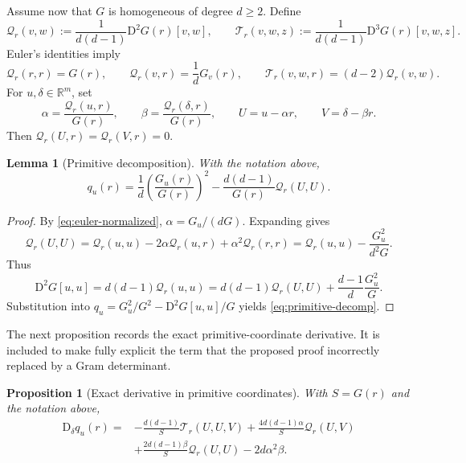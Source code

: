 \documentclass[11pt]{article}
\newtheorem{proposition}[theorem]{Proposition}
\newtheorem{lemma}[theorem]{Lemma}
\theoremstyle{definition}
\newcommand{\R}{\mathbb{R}}
\newcommand{\D}{\mathrm{D}}
\newcommand{\Q}{\mathcal{Q}}
\newcommand{\T}{\mathcal{T}}
\begin{document}
Assume now that $G$ is homogeneous of degree $d\ge2$.  Define
\[
 \Q_r(v,w):=\frac{1}{d(d-1)}\D^2G(r)[v,w],
 \qquad
 \T_r(v,w,z):=\frac{1}{d(d-1)}\D^3G(r)[v,w,z].
\]
Euler's identities imply
\begin{equation}\label{eq:euler-normalized}
 \Q_r(r,r)=G(r),
 \qquad
 \Q_r(v,r)=\frac1dG_v(r),
 \qquad
 \T_r(v,w,r)=(d-2)\Q_r(v,w).
\end{equation}
For $u,\delta\in\R^m$, set
\[
 \alpha=\frac{\Q_r(u,r)}{G(r)},\qquad
 \beta =\frac{\Q_r(\delta,r)}{G(r)},\qquad
 U=u-\alpha r,\qquad V=\delta-\beta r.
\]
Then $\Q_r(U,r)=\Q_r(V,r)=0$.

\begin{lemma}[Primitive decomposition]\label{lem:primitive-decomp}
With the notation above,
\begin{equation}\label{eq:primitive-decomp}
 q_u(r)
 =\frac1d\left(\frac{G_u(r)}{G(r)}\right)^2
  -\frac{d(d-1)}{G(r)}\Q_r(U,U).
\end{equation}
\end{lemma}

\begin{proof}
By \eqref{eq:euler-normalized}, $\alpha=G_u/(dG)$.  Expanding gives
\[
 \Q_r(U,U)=\Q_r(u,u)-2\alpha\Q_r(u,r)+\alpha^2\Q_r(r,r)
 =\Q_r(u,u)-\frac{G_u^2}{d^2G}.
\]
Thus
\[
 \D^2G[u,u]=d(d-1)\Q_r(u,u)
 =d(d-1)\Q_r(U,U)+\frac{d-1}{d}\frac{G_u^2}{G}.
\]
Substitution into
$q_u=G_u^2/G^2-\D^2G[u,u]/G$ yields \eqref{eq:primitive-decomp}.
\end{proof}

The next proposition records the exact primitive-coordinate derivative.  It is included to make
fully explicit the term that the proposed proof incorrectly replaced by a Gram determinant.

\begin{proposition}[Exact derivative in primitive coordinates]\label{prop:primitive-derivative}
With $S=G(r)$ and the notation above,
\begin{align}
 \D_\delta q_u(r)
 ={}&-\frac{d(d-1)}S\T_r(U,U,V)
     +\frac{4d(d-1)\alpha}{S}\Q_r(U,V) \label{eq:primitive-derivative}\\
    &+\frac{2d(d-1)\beta}{S}\Q_r(U,U)
     -2d\alpha^2\beta.\nonumber
\end{align}
\end{proposition}
\end{document}
